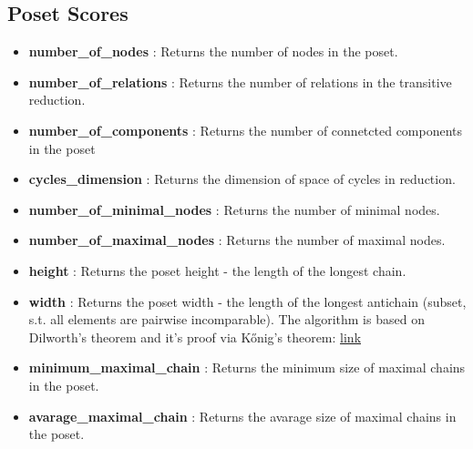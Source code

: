 \documentclass{article}
\begin{document}
\subsection{Poset Scores}
\begin{itemize}
\item \textbf{number\_of\_nodes }: Returns the number of nodes in the poset.
\item \textbf{number\_of\_relations }: Returns the number of relations in the transitive reduction.
\item \textbf{number\_of\_components }: Returns the number of connetcted components in the poset
\item \textbf{cycles\_dimension }: Returns the dimension of space of cycles in reduction.
\item \textbf{number\_of\_minimal\_nodes }: Returns the number of minimal nodes.
\item \textbf{number\_of\_maximal\_nodes }: Returns the number of maximal nodes.
\item \textbf{height }: Returns the poset height - the length of the longest chain.
\item \textbf{width }: Returns the poset width - the length of the longest antichain (subset, s.t. all elements are pairwise incomparable).
    The algorithm is based on Dilworth's theorem and it's proof via Kőnig's theorem:
    \href{https://en.wikipedia.org/wiki/Dilworth%27s_theorem}{link}
\item \textbf{minimum\_maximal\_chain }: Returns the minimum size of maximal chains in the poset.
\item \textbf{avarage\_maximal\_chain }: Returns the avarage size of maximal chains in the poset.
\end{itemize}
\end{document}
